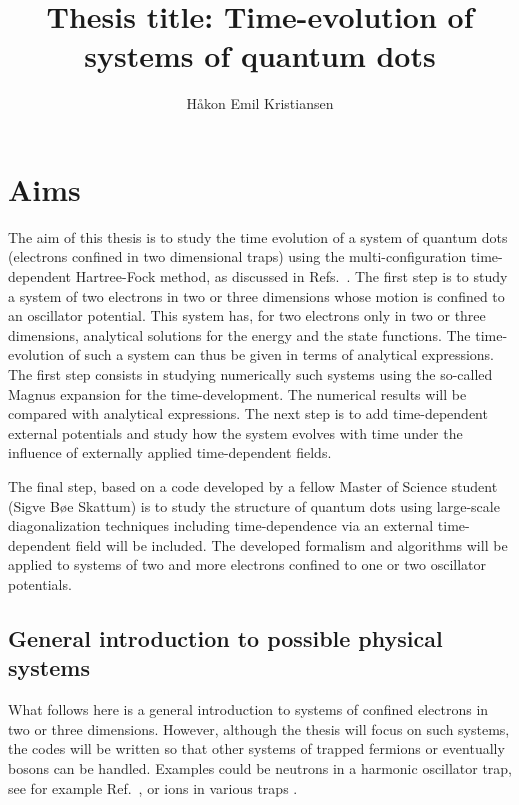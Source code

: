 \documentclass[10pt]{revtex4}
\begin{document}
\title{Thesis title: Time-evolution of  systems of quantum dots}
\author{H\aa kon Emil Kristiansen}
\maketitle
\section*{Aims}
The aim of this thesis is to study the time evolution of a system of quantum dots (electrons confined in
two dimensional traps) using the multi-configuration time-dependent Hartree-Fock method, as discussed in Refs.~\cite{mcthf,sigve2013}. The first step is to study a system of two electrons in two or three dimensions whose motion is confined  to an oscillator potential. This system has, for two electrons only in two or three dimensions, 
analytical solutions for the energy and the state functions. The time-evolution of such a system can thus be given in terms of analytical expressions. The first step consists in studying numerically such systems using the so-called Magnus expansion for the time-development. The numerical results will be compared with analytical expressions. The next step is to add time-dependent external potentials and study how the system evolves with time under the influence of externally applied time-dependent fields. 


The final step, based on a code developed by a fellow Master of Science student (Sigve B\o e Skattum) is to 
study the structure of quantum dots using large-scale diagonalization techniques including  time-dependence via an external time-dependent field will be included.  The developed formalism and algorithms will be applied to systems of two and more electrons confined to one or two oscillator potentials. 

\subsection*{General introduction to possible physical systems}




What follows here is a general introduction to systems of confined electrons in two or three dimensions.
However, although the thesis will focus on such systems, the codes will be written so 
that other systems of trapped 
fermions or eventually bosons can be handled. Examples could be neutrons in a harmonic oscillator trap, see for example Ref.~\cite{bogner2011}, or ions in various traps \cite{yoram2008}.  
\end{document}
